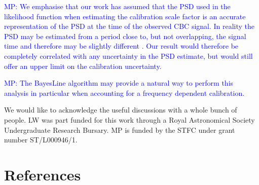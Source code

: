 \documentclass[10pt]{iopart}
\newcommand{\MP}[1]{\textcolor{blue}{MP: #1}}
\begin{document}
\MP{We emphasise that our work has assumed that the PSD used in the likelihood function
when estimating the calibration scale factor is an accurate representation of the
PSD at the time of the observed CBC signal. In reality the PSD may be estimated from
a period close to, but not overlapping, the signal time and therefore may be slightly
different \cite{2013PhRvD..88h4044L}. Our result would therefore be completely correlated
with any uncertainty in the PSD estimate, but would still offer an upper limit
on the calibration uncertainty.}

\MP{The BayesLine algorithm \cite{2015PhRvD..91h4034L} may provide a natural
way to perform this analysis in particular when accounting for a frequency
dependent calibration.}

\ack

We would like to acknowledge the useful discussions with a whole bunch
of people. LW was part funded for this work through a Royal Astronomical
Society Undergraduate Research Bursary.
MP is funded by the STFC under grant number ST/L000946/1.

\section*{References}



\end{document}

